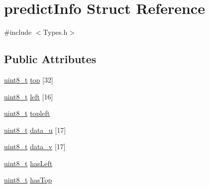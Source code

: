\hypertarget{structpredict_info}{
\section{predictInfo Struct Reference}
\label{structpredict_info}
}


{\ttfamily \#include $<$Types.h$>$}

\subsection*{Public Attributes}
\begin{DoxyCompactItemize}
\item 
\hyperlink{_types_8h_a363e4d606232036a6b89060813c45489}{uint8\_\-t} \hyperlink{structpredict_info_ab44f7aab3b6e76f7be44d5420f5f4407}{top} \mbox{[}32\mbox{]}
\item 
\hyperlink{_types_8h_a363e4d606232036a6b89060813c45489}{uint8\_\-t} \hyperlink{structpredict_info_aaec86d32b8769dabe17f60051a792e19}{left} \mbox{[}16\mbox{]}
\item 
\hyperlink{_types_8h_a363e4d606232036a6b89060813c45489}{uint8\_\-t} \hyperlink{structpredict_info_a2f363beeef9ca2f90a0db2259fc88f7b}{topleft}
\item 
\hyperlink{_types_8h_a363e4d606232036a6b89060813c45489}{uint8\_\-t} \hyperlink{structpredict_info_a4bb62e14becc6e2eeac45bc8d6a66688}{data\_\-u} \mbox{[}17\mbox{]}
\item 
\hyperlink{_types_8h_a363e4d606232036a6b89060813c45489}{uint8\_\-t} \hyperlink{structpredict_info_ad302972bab20c3c3c87ce4a25efd17a3}{data\_\-v} \mbox{[}17\mbox{]}
\item 
\hyperlink{_types_8h_a363e4d606232036a6b89060813c45489}{uint8\_\-t} \hyperlink{structpredict_info_abe5b70fdeb86bc2d99d9c3e65250fa8e}{hasLeft}
\item 
\hyperlink{_types_8h_a363e4d606232036a6b89060813c45489}{uint8\_\-t} \hyperlink{structpredict_info_a63e51107c5058064b6e8bc3fd6a08b46}{hasTop}
\end{DoxyCompactItemize}


